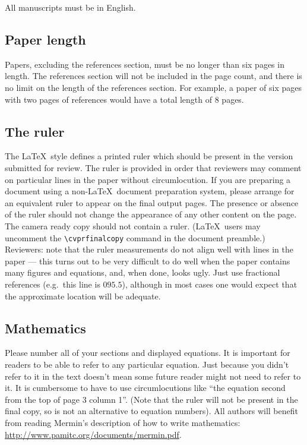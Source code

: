 \documentclass[10pt,twocolumn,letterpaper]{article}
\begin{document}
All manuscripts must be in English.


\subsection{Paper length}
Papers, excluding the references section,
must be no longer than six pages in length. The references section
will not be included in the page count, and there is no limit on the
length of the references section. For example, a paper of six pages
with two pages of references would have a total length of 8 pages.

\subsection{The ruler}
The \LaTeX\ style defines a printed ruler which should be present in the
version submitted for review.  The ruler is provided in order that
reviewers may comment on particular lines in the paper without
circumlocution.  If you are preparing a document using a non-\LaTeX\
document preparation system, please arrange for an equivalent ruler to
appear on the final output pages.  The presence or absence of the ruler
should not change the appearance of any other content on the page.  The
camera ready copy should not contain a ruler. (\LaTeX\ users may uncomment
the \verb'\cvprfinalcopy' command in the document preamble.)  Reviewers:
note that the ruler measurements do not align well with lines in the paper
--- this turns out to be very difficult to do well when the paper contains
many figures and equations, and, when done, looks ugly.  Just use fractional
references (e.g.\ this line is $095.5$), although in most cases one would
expect that the approximate location will be adequate.

\subsection{Mathematics}

Please number all of your sections and displayed equations.  It is
important for readers to be able to refer to any particular equation.  Just
because you didn't refer to it in the text doesn't mean some future reader
might not need to refer to it.  It is cumbersome to have to use
circumlocutions like ``the equation second from the top of page 3 column
1''.  (Note that the ruler will not be present in the final copy, so is not
an alternative to equation numbers).  All authors will benefit from reading
Mermin's description of how to write mathematics:
\url{http://www.pamitc.org/documents/mermin.pdf}.
\end{document}

